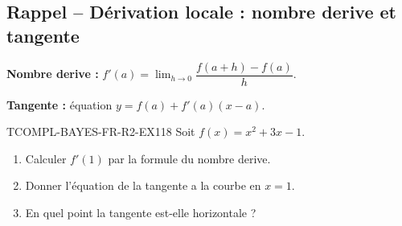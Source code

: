 

\subsection*{Rappel -- Dérivation locale : nombre derive et tangente}

\textbf{Nombre derive :} $f'(a) = \lim_{h \to 0} \dfrac{f(a+h) - f(a)}{h}$.

\textbf{Tangente :} équation $y = f(a) + f'(a)(x - a)$.

\begin{exercice}{TCOMPL-BAYES-FR-R2-EX1}{1}{8}
Soit $f(x) = x^2 + 3x - 1$.
\begin{enumerate}
  \item Calculer $f'(1)$ par la formule du nombre derive.
  \item Donner l'équation de la tangente a la courbe en $x = 1$.
  \item En quel point la tangente est-elle horizontale ?
\end{enumerate}
\end{exercice}

